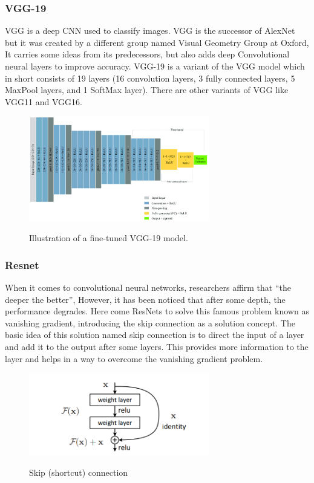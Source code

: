 \documentclass[12pt,a4paper,oneside,english]{book}
\begin{document}
\subsubsection{VGG-19}
VGG is a deep CNN used to classify images. VGG is the successor of AlexNet but it was created by a different group named Visual Geometry Group at Oxford, It carries some ideas from its predecessors, but also adds deep Convolutional neural layers to improve accuracy. VGG-19 is a variant of the VGG model which in short consists of 19 layers (16 convolution layers, 3 fully connected layers, 5 MaxPool layers, and 1 SoftMax layer). There are other variants of VGG like VGG11 and VGG16.
\begin{figure}[H]
    \centering
    \includegraphics[width=0.7\textwidth]{figures/Illustration-of-fine-tuned-VGG19-pre-trained-CNN-model.png}
    \caption{Illustration of a fine-tuned VGG-19 model.}
    \label{fig:vgg}
    \cite{vgg19}
\end{figure}
\noindent

\subsubsection{Resnet}
When it comes to convolutional neural networks, researchers affirm that “the deeper the better”, However, it has been noticed that after some depth, the performance degrades. Here come ResNets to solve this famous problem known as vanishing gradient, introducing the skip connection as a solution concept.
The basic idea of this solution named skip connection is to direct the input of a layer and add it to the output after some layers. This provides more information to the layer and helps in a way to overcome the vanishing gradient problem.

\begin{figure}[H]
    \centering
    \includegraphics[width=0.7\textwidth]{figures/Residual-Block.png}
    \caption{Skip (shortcut) connection}
    \label{fig:resnet}
    \cite{resnet}
\end{figure}
\noindent
\end{document}

